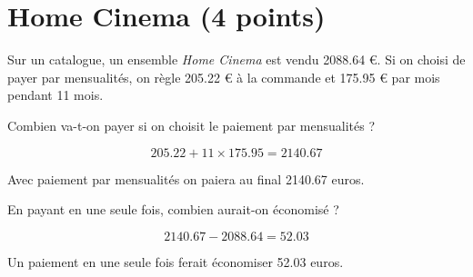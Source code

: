 \section{Home Cinema (4 points)}

Sur un catalogue, un ensemble \textit{Home Cinema} est vendu \num{2088.64} €.
Si on choisi de payer par mensualités, on règle \num{205.22} € à la commande et \num{175.95} € par mois pendant 11 mois.

\begin{questions}
	\question[2] Combien va-t-on payer si on choisit le paiement par mensualités ?
	\begin{solution}
		\begin{equation*}
			\num{205.22} + 11 \times \num{175.95} = \num{2140.67}
		\end{equation*}
		
		Avec paiement par mensualités on paiera au final \num{2140.67} euros.
	\end{solution}
	
	\question[2] En payant en une seule fois, combien aurait-on économisé ?
	\begin{solution}
		\begin{equation*}
		\num{2140.67} - \num{2088.64} = \num{52.03}
		\end{equation*}
		
		Un paiement en une seule fois ferait économiser \num{52.03} euros.
	\end{solution}
		
\end{questions}